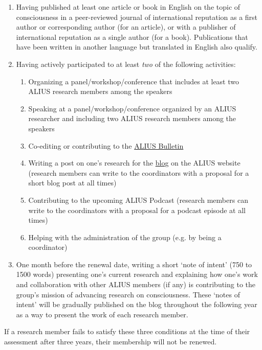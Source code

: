 \documentclass[a4paper, 11pt]{scrartcl}
\begin{document}
\begin{enumerate}

\item Having published at least one article or book in English on the topic of consciousness in a peer-reviewed journal of international reputation as a first author or corresponding author (for an article), or with a publisher of international reputation as a single author (for a book). Publications that have been written in another language but translated in English also qualify.

\item Having actively participated to at least \emph{two} of the following activities:

\begin{enumerate} 
\item Organizing a panel/workshop/conference that includes at least two ALIUS research members among the speakers
\item Speaking at a panel/workshop/conference organized by an ALIUS researcher and including two ALIUS research members among the speakers
\item Co-editing or contributing to the \href{https://www.aliusresearch.org/bulletin.html}{ALIUS Bulletin} 
\item Writing a post on one's research for the \href{https://www.aliusresearch.org/blog.html}{blog} on the ALIUS website (research members can write to the coordinators with a proposal for a short blog post at all times)
\item Contributing to the upcoming ALIUS Podcast (research members can write to the coordinators with a proposal for a podcast episode at all times)
\item Helping with the administration of the group (e.g. by being a coordinator)
\end{enumerate} 

\item One month before the renewal date, writing a short `note of intent' (750 to 1500 words) presenting one's current research and explaining how one's work and collaboration with other ALIUS members (if any) is contributing to the group's mission of advancing research on consciousness. These `notes of intent' will be gradually published on the blog throughout the following year as a way to present the work of each research member.

\end{enumerate}

If a research member fails to satisfy these three conditions at the time of their assessment after three years, their membership will not be renewed.
\end{document}
